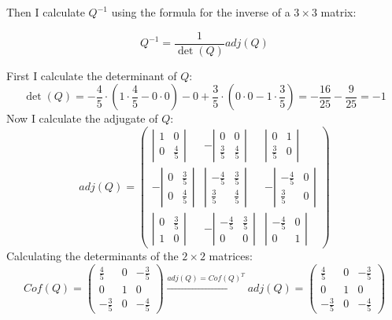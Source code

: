 \documentclass[11pt, a4paper]{article}
\begin{document}
Then I calculate $Q^{-1}$ using the formula for the inverse of a $3 \times 3$ matrix:

\[
Q^{-1} = \frac{1}{\det(Q)} adj(Q)
\]

First I calculate the determinant of $Q$:
\[
\det(Q) = -\frac{4}{5} \cdot \left(1 \cdot \frac{4}{5} - 0 \cdot 0\right) - 0 + \frac{3}{5} \cdot \left(0 \cdot 0 - 1 \cdot \frac{3}{5}\right) = -\frac{16}{25} - \frac{9}{25} = -1
\]
Now I calculate the adjugate of $Q$:
\[
adj(Q) = 
\begin{pmatrix}
	\left| \begin{matrix}
		1 & 0 \\
		0 & \frac{4}{5}
	\end{matrix} \right| & -\left| \begin{matrix}
		0 & 0 \\
		\frac{3}{5} & \frac{4}{5}
	\end{matrix} \right| & \left| \begin{matrix}
		0 & 1 \\
		\frac{3}{5} & 0
	\end{matrix} \right| \\
	-\left| \begin{matrix}
		0 & \frac{3}{5} \\
		0 & \frac{4}{5}
	\end{matrix} \right| & \left| \begin{matrix}
		-\frac{4}{5} & \frac{3}{5} \\
		\frac{3}{5} & \frac{4}{5}
	\end{matrix} \right| & -\left| \begin{matrix}
		-\frac{4}{5} & 0 \\
		\frac{3}{5} & 0
	\end{matrix} \right| \\
	\left| \begin{matrix}
		0 & \frac{3}{5} \\
		1 & 0
	\end{matrix} \right| & -\left| \begin{matrix}
		-\frac{4}{5} & \frac{3}{5} \\
		0 & 0
	\end{matrix} \right| & \left| \begin{matrix}
		-\frac{4}{5} & 0 \\
		0 & 1
	\end{matrix} \right|
\end{pmatrix}
\]
Calculating the determinants of the $2 \times 2$ matrices:
\[
\textit{Cof}(Q) = 
\begin{pmatrix}
	\frac{4}{5} & 0 & -\frac{3}{5} \\
	0 & 1 & 0 \\
	-\frac{3}{5} & 0 & -\frac{4}{5}
\end{pmatrix} \xrightarrow{adj(Q) = {\textit{Cof}(Q)}^{T}}
adj(Q) = 
\begin{pmatrix}
	\frac{4}{5} & 0 & -\frac{3}{5} \\
	0 & 1 & 0 \\
	-\frac{3}{5} & 0 & -\frac{4}{5}
\end{pmatrix}
\]
\end{document}
